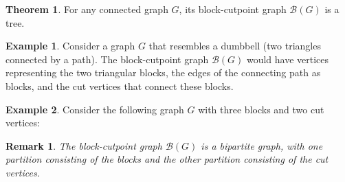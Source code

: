 \documentclass{article}
\newtheorem{remark}{Remark}
\theoremstyle{definition}
\newtheorem{example}{Example}
\newtheorem{theorem}{Theorem}
\begin{document}
\begin{theorem}
For any connected graph $G$, its block-cutpoint graph $\mathcal{B}(G)$ is a tree.
\end{theorem}

\begin{example}
Consider a graph $G$ that resembles a dumbbell (two triangles connected by a path). The block-cutpoint graph $\mathcal{B}(G)$ would have vertices representing the two triangular blocks, the edges of the connecting path as blocks, and the cut vertices that connect these blocks.
\end{example}

\begin{example}
Consider the following graph $G$ with three blocks and two cut vertices:

\begin{center}
\noindent\begin{minipage}{\linewidth}\centering
{}
\label{fig:blocks-cut-vertices}
\end{minipage}
\end{center}
\end{example}

\begin{remark}
The block-cutpoint graph $\mathcal{B}(G)$ is a bipartite graph, with one partition consisting of the blocks and the other partition consisting of the cut vertices.
\end{remark}
\end{document}
